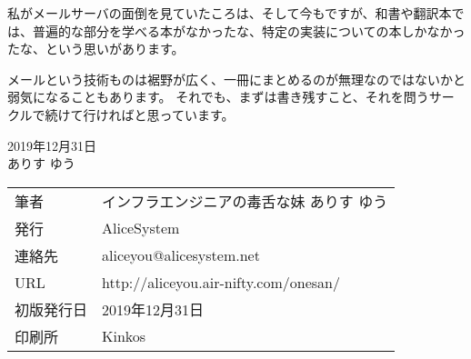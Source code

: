 私がメールサーバの面倒を見ていたころは、そして今もですが、和書や翻訳本では、普遍的な部分を学べる本がなかったな、特定の実装についての本しかなかったな、という思いがあります。

メールという技術ものは裾野が広く、一冊にまとめるのが無理なのではないかと弱気になることもあります。
それでも、まずは書き残すこと、それを問うサークルで続けて行ければと思っています。

\begin{flushright}
2019年12月31日 \\
ありす ゆう
\end{flushright}



\thispagestyle{empty}
\mbox{}
\newpage
\clearpage




\vspace*{\fill}
\begin{tabular}{ll} \toprule
筆者 & インフラエンジニアの毒舌な妹 ありす ゆう\\
発行 & AliceSystem \\
連絡先 & aliceyou@alicesystem.net \\
URL & http://aliceyou.air-nifty.com/onesan/ \\
初版発行日 & 2019年12月31日 \\
印刷所 & Kinkos  \\ \bottomrule
\end{tabular}